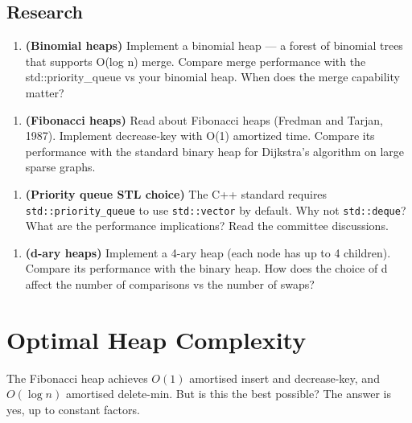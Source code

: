 \subsection{Research}

\begin{enumerate}
\item \textbf{(Binomial heaps)} Implement a binomial heap — a forest of binomial trees that supports O(log n) merge. Compare merge performance with the std::priority\_queue vs your binomial heap. When does the merge capability matter?
\end{enumerate}

\begin{enumerate}
\item \textbf{(Fibonacci heaps)} Read about Fibonacci heaps (Fredman and Tarjan, 1987). Implement decrease-key with O(1) amortized time. Compare its performance with the standard binary heap for Dijkstra's algorithm on large sparse graphs.
\end{enumerate}

\begin{enumerate}
\item \textbf{(Priority queue STL choice)} The C++ standard requires \texttt{std::priority\_queue} to use \texttt{std::vector} by default. Why not \texttt{std::deque}? What are the performance implications? Read the committee discussions.
\end{enumerate}

\begin{enumerate}
\item \textbf{(d-ary heaps)} Implement a 4-ary heap (each node has up to 4 children). Compare its performance with the binary heap. How does the choice of d affect the number of comparisons vs the number of swaps?
\end{enumerate}


\section{Optimal Heap Complexity}
\label{sec:optimal-heap}

The Fibonacci heap achieves $O(1)$ amortised insert and decrease-key, and $O(\log n)$ amortised delete-min. But is this the best possible? The answer is yes, up to constant factors.

